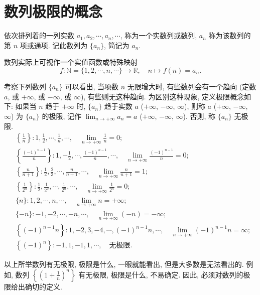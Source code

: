 \section{数列极限的概念}\label{sec:1.1}

依次排列着的一列实数 $a_{1}, a_{2}, \cdots, a_{n}, \cdots$, 称为一个实数列或数列, $a_{n}$ 称为该数列的第 $n$ 项或通项. 记此数列为 $\{a_{n}\}$, 简记为 $a_{n}$.

数列实际上可视作一个实值函数或特殊映射
\[
  f: \mathbb{N} = \{1, 2, \cdots, n, \cdots\} \to \mathbb{R},\quad n \mapsto f(n) = a_n.
\]

考察下列数列 $\{a_{n}\}$ 可以看出, 当项数 $n$ 无限增大时, 有些数列会有一个趋向 (定数 $a$, 或 $+\infty$, 或 $-\infty$, 或 $\infty$), 有些则无这种趋向. 为区别这种现象, 定义极限概念如下: 如果当 $n$ 趋于 $+\infty$ 时, $\{a_{n}\}$ 趋于实数 $a$ ($+\infty$, $-\infty$, $\infty$), 则称 $a$ ($+\infty$, $-\infty$, $\infty$) 为 $\{a_{n}\}$ 的极限, 记作 $\lim_{n\to+\infty}a_{n}=a$ ($+\infty$, $-\infty$, $\infty$). 否则, 称 $\{a_{n}\}$ 无极限.
\begin{align*}
  &\left\{\frac{1}{n}\right\}: 1, \frac{1}{2}, \cdots, \frac{1}{n}, \cdots,\quad \lim_{n\to+\infty}\frac{1}{n}=0;\\
  &\left\{\frac{(-1)^{n-1}}{n}\right\}: 1, -\frac{1}{2}, \cdots, \frac{(-1)^{n-1}}{n}, \cdots,\quad \lim_{n\to+\infty}\frac{(-1)^{n-1}}{n}=0;\\
  &\left\{\frac{n}{n+1}\right\}: \frac{1}{2}, \frac{2}{3}, \cdots, \frac{n}{n+1}, \cdots,\quad \lim_{n\to+\infty}\frac{n}{n+1}=1;\\
  &\left\{\frac{1}{2^{n}}\right\}: \frac{1}{2}, \frac{1}{2^{2}}, \cdots, \frac{1}{2^{n}}, \cdots,\quad \lim_{n\to+\infty}\frac{1}{2^{n}}=0;\\
  &\{n\}: 1, 2, \cdots, n, \cdots,\quad \lim_{n\to+\infty}n=+\infty;\\
  &\{-n\}: -1, -2, \cdots, -n, \cdots,\quad \lim_{n\to+\infty}(-n)=-\infty;\\
  &\left\{(-1)^{n-1}n\right\}: 1, -2, 3, -4, \cdots, (-1)^{n-1}n, \cdots,\quad \lim_{n\to+\infty}(-1)^{n-1}n=\infty;\\
  &\left\{(-1)^{n}\right\}: -1, 1, -1, 1, \cdots,\quad \text{无极限}.
\end{align*}

以上所举数列有无极限, 极限是什么, 一眼就能看出, 但是大多数是无法看出的. 例如, 数列 $\left\{(1+\frac{1}{n})^{n}\right\}$ 有无极限, 极限是什么, 不易确定. 因此, 必须对数列的极限给出确切的定义.

